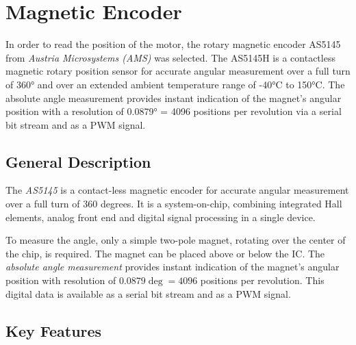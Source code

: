 

\lstset { %
    language=C++,
    basicstyle=\footnotesize,%
    breaklines=true,
    frame=single
}

\section{Magnetic Encoder}\label{Sec:Mag_enc}

In order to read the position of the motor, the rotary magnetic encoder AS5145 from \textit{Austria Microsystems (AMS)} was selected. The AS5145H is a contactless magnetic rotary position sensor for accurate angular measurement over a full turn of 360° and over an extended ambient temperature range of -40°C to 150°C. The absolute angle measurement provides instant indication of the magnet’s angular position with a resolution of 0.0879° = 4096 positions per revolution via a serial bit stream and as a PWM signal.

\subsection{General Description}

The \textit{AS5145} is a contact-less magnetic encoder for accurate angular measurement over a full turn of 360 degrees. It is a system-on-chip, combining integrated Hall elements, analog front end and digital signal processing in a single device.

To measure the angle, only a simple two-pole magnet, rotating over the center of the chip, is required. The magnet can be placed above or below the IC. The \textit{absolute angle measurement} provides instant indication of the magnet's angular position with resolution of $0.0879\deg = 4096$ positions per revolution. This digital data is available as a serial bit stream and as a PWM signal.

\subsection{Key Features}

